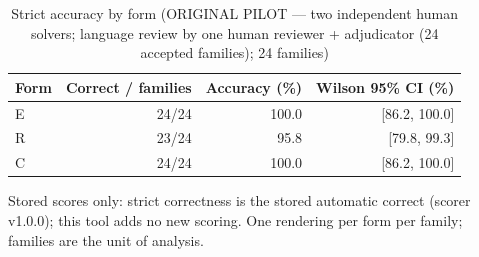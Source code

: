 \begin{table}[t]
\centering
\small
\caption{Strict accuracy by form (ORIGINAL PILOT --- two independent human solvers; language review by one human reviewer + adjudicator (24 accepted families); 24 families)}
\label{tab:pilotorig-Qwen3-8B-accuracy}
\begin{tabular}{lrrr}
\toprule
Form & Correct / families & Accuracy (\%) & Wilson 95\% CI (\%) \\
\midrule
E & 24/24 & 100.0 & [86.2, 100.0] \\
R & 23/24 & 95.8 & [79.8, 99.3] \\
C & 24/24 & 100.0 & [86.2, 100.0] \\
\bottomrule
\end{tabular}
\par\smallskip
\parbox{\linewidth}{\footnotesize Stored scores only: strict correctness is the stored automatic correct (scorer v1.0.0); this tool adds no new scoring. One rendering per form per family; families are the unit of analysis.}
\end{table}
